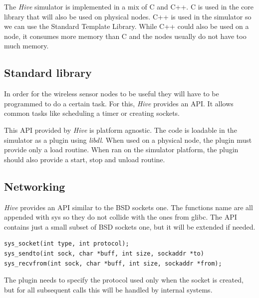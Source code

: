 
The \textit{Hive} simulator is implemented in a mix of C and C++. C is used in the core
library that will also be used on physical nodes. C++ is used in the
simulator so we can use the Standard Template Library. While C++ could also be
used on a node, it consumes more memory than C and the nodes usually do not
have too much memory.

\subsection{Standard library}

In order for the wireless sensor nodes to be useful they will have to be
programmed to do a certain task. For this, \textit{Hive} provides an API. It allows
common tasks like scheduling a timer or creating sockets. 

This API provided by \textit{Hive} is platform agnostic. The code is loadable in the
simulator as a plugin using \textit{libdl}. When used on a physical node, the plugin must
provide only a load routine. When ran on the simulator platform, the plugin
should also provide a start, stop and unload routine.

\subsection{Networking}

\textit{Hive} provides an API similar to the BSD sockets one. The functions name are
all appended with sys so they do not collide with the ones from glibc. The API
contains just a small subset of BSD sockets one, but it will be extended if needed.
\begin{lstlisting}
sys_socket(int type, int protocol);
sys_sendto(int sock, char *buff, int size, sockaddr *to)
sys_recvfrom(int sock, char *buff, int size, sockaddr *from);
\end{lstlisting}
The plugin needs to specify the protocol used only when the socket is created,
but for all subsequent calls this will be handled by internal systems. 

